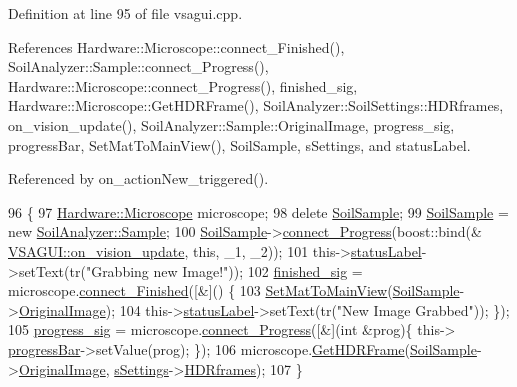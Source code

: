 Definition at line 95 of file vsagui.\+cpp.



References Hardware\+::\+Microscope\+::connect\+\_\+\+Finished(), Soil\+Analyzer\+::\+Sample\+::connect\+\_\+\+Progress(), Hardware\+::\+Microscope\+::connect\+\_\+\+Progress(), finished\+\_\+sig, Hardware\+::\+Microscope\+::\+Get\+H\+D\+R\+Frame(), Soil\+Analyzer\+::\+Soil\+Settings\+::\+H\+D\+Rframes, on\+\_\+vision\+\_\+update(), Soil\+Analyzer\+::\+Sample\+::\+Original\+Image, progress\+\_\+sig, progress\+Bar, Set\+Mat\+To\+Main\+View(), Soil\+Sample, s\+Settings, and status\+Label.



Referenced by on\+\_\+action\+New\+\_\+triggered().


\begin{DoxyCode}
96 \{
97     \hyperlink{class_hardware_1_1_microscope}{Hardware::Microscope} microscope;
98     \textcolor{keyword}{delete} \hyperlink{class_v_s_a_g_u_i_ac90517c9baea0a75455d43d5eb77d3e7}{SoilSample};
99     \hyperlink{class_v_s_a_g_u_i_ac90517c9baea0a75455d43d5eb77d3e7}{SoilSample} = \textcolor{keyword}{new} \hyperlink{class_soil_analyzer_1_1_sample}{SoilAnalyzer::Sample};
100     \hyperlink{class_v_s_a_g_u_i_ac90517c9baea0a75455d43d5eb77d3e7}{SoilSample}->\hyperlink{class_soil_analyzer_1_1_sample_a472dfdde346375463c979e45eb75fbb7}{connect\_Progress}(boost::bind(&
      \hyperlink{class_v_s_a_g_u_i_a8a5092f741e17c73b04850a6b30dda04}{VSAGUI::on\_vision\_update}, \textcolor{keyword}{this}, \_1, \_2));
101     this->\hyperlink{class_v_s_a_g_u_i_a8cbaaa3b5e0975b7a1101b9bef3c9b57}{statusLabel}->setText(tr(\textcolor{stringliteral}{"Grabbing new Image!"}));
102     \hyperlink{class_v_s_a_g_u_i_a670325c6bab3874937f0a9b7e8e3b370}{finished\_sig} = microscope.\hyperlink{class_hardware_1_1_microscope_abc3f008ec7cf00e6ddf31b0a4ed392cb}{connect\_Finished}([&]() \{
103         \hyperlink{class_v_s_a_g_u_i_a988508cf880e27fcd8a029b94e546bcc}{SetMatToMainView}(\hyperlink{class_v_s_a_g_u_i_ac90517c9baea0a75455d43d5eb77d3e7}{SoilSample}->\hyperlink{class_soil_analyzer_1_1_sample_a0d6e6fca9e232a77329daf0b4b29c634}{OriginalImage});
104         this->\hyperlink{class_v_s_a_g_u_i_a8cbaaa3b5e0975b7a1101b9bef3c9b57}{statusLabel}->setText(tr(\textcolor{stringliteral}{"New Image Grabbed"})); \});
105     \hyperlink{class_v_s_a_g_u_i_a3503e0415ff202c93fc4d7ee5c6f4fb8}{progress\_sig} = microscope.\hyperlink{class_hardware_1_1_microscope_abc29f83a2f0ba536df3eb7ccc250b111}{connect\_Progress}([&](\textcolor{keywordtype}{int} &prog)\{ this->
      \hyperlink{class_v_s_a_g_u_i_a17b71e08eeff21b28e3816ec5482473c}{progressBar}->setValue(prog); \});
106     microscope.\hyperlink{class_hardware_1_1_microscope_a8cec2eacbd3f0ea164d16100a6078d5b}{GetHDRFrame}(\hyperlink{class_v_s_a_g_u_i_ac90517c9baea0a75455d43d5eb77d3e7}{SoilSample}->\hyperlink{class_soil_analyzer_1_1_sample_a0d6e6fca9e232a77329daf0b4b29c634}{OriginalImage}, 
      \hyperlink{class_v_s_a_g_u_i_a4a0358d00aa3cb520a9a1321962b0d4d}{sSettings}->\hyperlink{class_soil_analyzer_1_1_soil_settings_a77e631ff44efe74762b5adaa2eb2cd11}{HDRframes});
107 \}
\end{DoxyCode}


